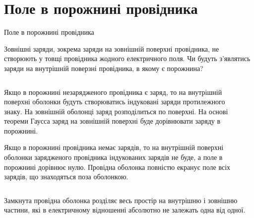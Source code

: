 \documentclass{beamer}
\begin{document}
\section{Поле в порожнині провідника}




\begin{frame}{Поле в порожнині провідника}
	\begin{block}{}\justifying
		Зовнішні заряди, зокрема заряди на зовнішній поверхні провідника, не створюють у товщі
		провідника жодного електричного поля. \alert{Чи будуть з'являтись заряди на внутрішній поверзні
			провідника, в якому є порожнина?}
	\end{block}
	\begin{columns}
		\begin{column}{0.7\linewidth}
			\begin{overprint}
				\begin{block}{}\justifying\small
					Якщо в \alert{порожнині незарядженого провідника є заряд}, то на внутрішній
					поверхні оболонки будуть створюватись індуковані заряди протилежного знаку. На
					зовнішній оболонці заряд розподілиться по поверхні. На основі теореми Гаусса заряд
					на зовнішній поверхні буде дорівнювати заряду в порожнині.
				\end{block}
				\begin{block}{}\justifying\small
					Якщо в \alert{порожнині провідника немає зарядів}, то на внутрішній поверхні
					оболонки зарядженого провідника індукованих зарядів не буде, а поле в порожнині
					дорівнює нулю. Провідна оболонка повністю екранує поле всіх зарядів, що знаходяться
					поза оболонкою.
				\end{block}
			\end{overprint}
		\end{column}
		\begin{column}{0.3\linewidth}\centering
			\begin{overprint}\centering
				\onslide<1>
				
				\onslide<2>
				
			\end{overprint}
		\end{column}
	\end{columns}
	\begin{alertblock}{}\justifying
		Замкнута провідна оболонка розділяє весь простір на внутрішню і зовнішню частини, які в
		електричному відношенні абсолютно \alert{не залежать одна від одної}.
	\end{alertblock}
\end{frame}
\end{document}
